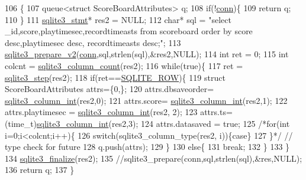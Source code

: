\begin{DoxyCode}
106                                                               \{
107                 queue<struct ScoreBoardAttributes> q;
108                 \textcolor{keywordflow}{if}(!\hyperlink{class_tetris_1_1_d_b_management_1_1_d_b_manager_acc2c19420c2b1b1b2c1e724b3a8ec4b7}{conn})\{
109                     \textcolor{keywordflow}{return} q;
110                 \}
111                 \hyperlink{sqlite3_8h_af2a033da1327cdd77f0a174a09aedd0c}{sqlite3\_stmt}* res2 = NULL;
112                 \textcolor{keywordtype}{char}* sql = \textcolor{stringliteral}{"select \_id,score,playtimesec,recordtimeasts from scoreboard order by score
       desc,playtimesec desc, recordtimeasts desc;"};
113                 \hyperlink{sqlite3_8h_a85d4203bb54c984c5325c2f5b3664985}{sqlite3\_prepare\_v2}(\hyperlink{class_tetris_1_1_d_b_management_1_1_d_b_manager_acc2c19420c2b1b1b2c1e724b3a8ec4b7}{conn},sql,strlen(sql),&res2,NULL);
114                 \textcolor{keywordtype}{int} ret = 0;
115                 \textcolor{keywordtype}{int} colcnt = \hyperlink{sqlite3_8h_a326cbde878820fd108f5961d5318f585}{sqlite3\_column\_count}(res2);
116                 \textcolor{keywordflow}{while}(\textcolor{keyword}{true})\{
117                     ret = \hyperlink{sqlite3_8h_ac1e491ce36b7471eb28387f7d3c74334}{sqlite3\_step}(res2);
118                     \textcolor{keywordflow}{if}(ret==\hyperlink{sqlite3_8h_a624365823d0b11a99ccb49e9bb5f8fcf}{SQLITE\_ROW})\{
119                         \textcolor{keyword}{struct }ScoreBoardAttributes attrs=\{0,\};
120                         attrs.dbsaveorder= \hyperlink{sqlite3_8h_a6bd16f5b3266f473e37e8e3d4ebb4290}{sqlite3\_column\_int}(res2,0);
121                         attrs.score= \hyperlink{sqlite3_8h_a6bd16f5b3266f473e37e8e3d4ebb4290}{sqlite3\_column\_int}(res2,1);
122                         attrs.playtimesec = \hyperlink{sqlite3_8h_a6bd16f5b3266f473e37e8e3d4ebb4290}{sqlite3\_column\_int}(res2, 2);
123                         attrs.ts= (time\_t)\hyperlink{sqlite3_8h_a6bd16f5b3266f473e37e8e3d4ebb4290}{sqlite3\_column\_int}(res2,3);
124                         attrs.datasaved = \textcolor{keyword}{true};
125                         \textcolor{comment}{/*for(int i=0;i<colcnt;i++)\{}
126 \textcolor{comment}{                            switch(sqlite3\_column\_type(res2, i))\{case\}}
127 \textcolor{comment}{                        \}*/} \textcolor{comment}{// type check for future}
128                         q.push(attrs);
129                     \}
130                     \textcolor{keywordflow}{else}\{
131                         \textcolor{keywordflow}{break};
132                     \}
133                 \}
134                 \hyperlink{sqlite3_8h_a801195c0f771d40bb4be1e40f3b88945}{sqlite3\_finalize}(res2);
135                 \textcolor{comment}{//sqlite3\_prepare(conn,sql,strlen(sql),&res,NULL);}
136                 \textcolor{keywordflow}{return} q;
137             \}
\end{DoxyCode}
